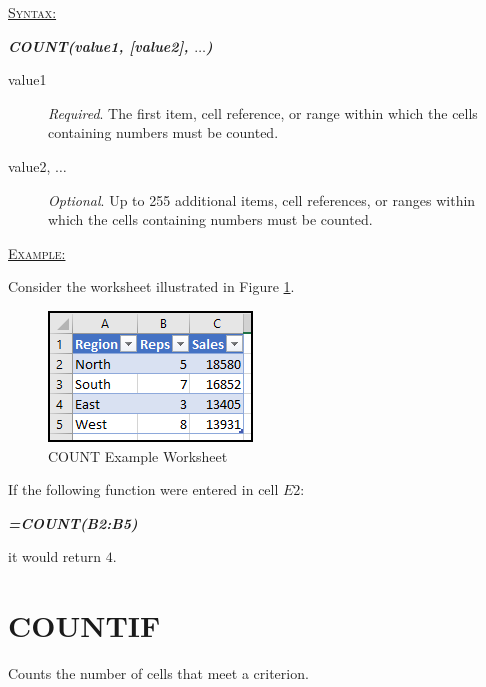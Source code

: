 \begin{addmargin}[1cm]{0cm}

	\medskip
	\underline{\textsc{Syntax:}}
	\medskip

	{\color{Syntax}
		\noindent\textbf{\textit{COUNT(value1, [value2], $\ldots$)}}
	}
	
	\begin{description}
		\item[value1] \textit{Required}. The first item, cell reference, or range within which the cells containing numbers must be counted.
		\item[value2, $\ldots$] \textit{Optional}. Up to 255 additional items, cell references, or ranges within which the cells containing numbers must be counted.
	\end{description}

	\medskip
	\noindent\underline{\textsc{Example:}}
	\medskip
	
	\noindent Consider the worksheet illustrated in Figure \ref{apa:cnt}.

	\begin{figure}[H]
		\centering
		\includegraphics[width=\maxwidth{.45\linewidth}]{gfx/apa_fig01}
		\caption{COUNT Example Worksheet}
		\label{apa:cnt}
	\end{figure}
	
	\noindent If the following function were entered in cell $ E2 $:
	
	{\color{Syntax}
		\textit{\textbf{=COUNT(B2:B5)}}
	}

	\noindent it would return $ 4 $.

\end{addmargin}

\section{COUNTIF}

Counts the number of cells that meet a criterion.

